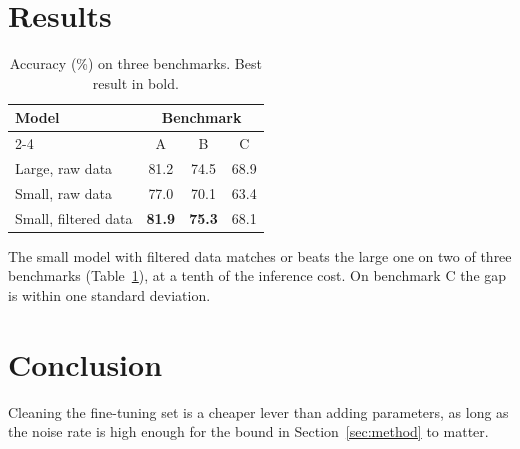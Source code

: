 \documentclass{article}
\begin{document}
\section{Results}

\begin{table}[t]
  \centering
  \caption{Accuracy (\%) on three benchmarks. Best result in bold.}
  \label{tab:results}
  \begin{tabular}{lccc}
    \toprule
    \multirow{2}{*}{Model} & \multicolumn{3}{c}{Benchmark} \\
    \cmidrule(lr){2-4}
     & A & B & C \\
    \midrule
    Large, raw data      & 81.2 & 74.5 & 68.9 \\
    Small, raw data      & 77.0 & 70.1 & 63.4 \\
    Small, filtered data & \textbf{81.9} & \textbf{75.3} & 68.1 \\
    \bottomrule
  \end{tabular}
\end{table}

The small model with filtered data matches or beats the large one on two of
three benchmarks (Table~\ref{tab:results}), at a tenth of the inference
cost. On benchmark C the gap is within one standard deviation.

\section{Conclusion}

Cleaning the fine-tuning set is a cheaper lever than adding parameters,
as long as the noise rate is high enough for the bound in
Section~\ref{sec:method} to matter.



\end{document}
